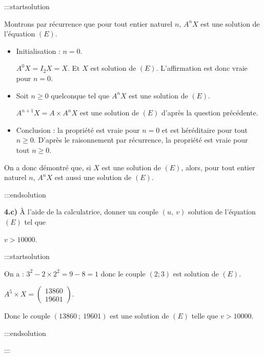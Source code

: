 \documentclass[12pt]{cornouaille}
\begin{document}
:::startsolution

Montrons par récurrence que pour tout entier naturel $n$, $A^nX$ est une solution de l'équation $(E)$.


\begin{itemize}
\item Initialisation : $n=0$.

$A^0X=I_2X=X$. Et $X$ est solution de $(E)$. L'affirmation est donc vraie pour $n=0$.

\item Soit $n \geqslant 0$ quelconque tel que $A^nX$ est une solution de $(E)$.

$A^{n+1}X=A \times A^nX$ est une solution de $(E)$ d'après la question précédente.
\item Conclusion : la propriété est vraie pour $n=0$ et est
héréditaire pour tout $n\geqslant 0$. D'après le raisonnement par récurrence, la propriété est vraie pour tout $n\geqslant 0$.
\end{itemize}


On a donc démontré que, si $X$ est une solution de $(E)$, alors, pour tout entier naturel $n$, $A^nX$ est aussi une solution de $(E)$.


:::endsolution


\textbf{4.c) } À l'aide de la calculatrice, donner un couple $(u,~v)$ solution de l'équation $(E)$ tel que

$v > 10000$.


:::startsolution

On a : $3^2-2 \times 2^2=9-8=1$ donc le couple $(2;3)$ est solution de $(E)$.

$A^5 \times X = 
\begin{pmatrix} 13860\\ 19601\end{pmatrix}
$.

Donc le couple $(13860~;~19601)$ est une solution de $(E)$ telle que $v > 10000$.


:::endsolution








:::
\end{document}
